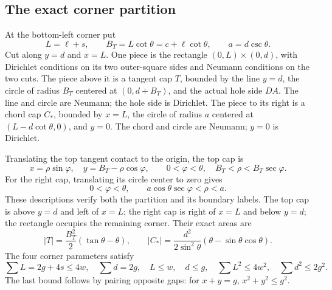 \documentclass[11pt,reqno]{amsart}
\numberwithin{equation}{section}
\begin{document}
\subsection{The exact corner partition}
\label{geo:corners}

At the bottom-left corner put
\[
 L=\ell+s,\qquad B_T=L\cot\theta=c+\ell\cot\theta,
 \qquad a=d\csc\theta.
\]
Cut along $y=d$ and $x=L$.  One piece is the rectangle
$(0,L)\times(0,d)$, with Dirichlet conditions on its two outer-square
sides and Neumann conditions on the two cuts.  The piece above it is
a tangent cap $T$, bounded by the line $y=d$, the circle of radius
$B_T$ centered at $(0,d+B_T)$, and the actual hole side $DA$.
The line and circle are Neumann; the hole side is Dirichlet.  The piece
to its right is a chord cap $C_*$, bounded by $x=L$, the circle of
radius $a$ centered at $(L-d\cot\theta,0)$, and $y=0$.
The chord and circle are Neumann; $y=0$ is Dirichlet.

Translating the top tangent contact to the origin, the top cap is
\[
 x=\rho\sin\varphi,\quad y=B_T-\rho\cos\varphi,
 \qquad0<\varphi<\theta,\quad B_T<\rho<B_T\sec\varphi.
\]
For the right cap, translating its circle center to zero gives
\[
 0<\varphi<\theta,
 \qquad a\cos\theta\sec\varphi<\rho<a.
\]
These descriptions verify both the partition and its boundary labels.
The top cap is above $y=d$ and left of $x=L$; the right cap is right
of $x=L$ and below $y=d$; the rectangle occupies the remaining corner.
Their exact areas are
\begin{equation}\label{geo:true-cap-areas}
 |T|=\frac{B_T^2}{2}(\tan\theta-\theta),\qquad
 |C_*|=\frac{d^2}{2\sin^2\theta}
                     (\theta-\sin\theta\cos\theta).
\end{equation}
The four corner parameters satisfy
\begin{equation}\label{geo:corner-sums}
 \sum L=2g+4s\le4w,\quad \sum d=2g,\quad
 L\le w,\quad d\le g,\quad
 \sum L^2\le4w^2,\quad\sum d^2\le2g^2.
\end{equation}
The last bound follows by pairing opposite gaps: for $x+y=g$,
$x^2+y^2\le g^2$.
\end{document}
